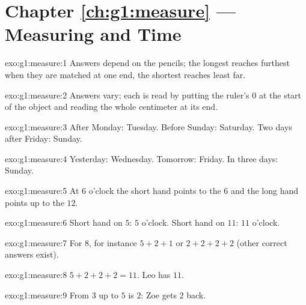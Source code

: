 \section*{Chapter \ref{ch:g1:measure} --- Measuring and Time}

\begin{solution}{exo:g1:measure:1}
Answers depend on the pencils; the longest reaches furthest when
they are matched at one end, the shortest reaches least far.
\end{solution}

\begin{solution}{exo:g1:measure:2}
Answers vary; each is read by putting the ruler's $0$ at the start
of the object and reading the whole centimeter at its end.
\end{solution}

\begin{solution}{exo:g1:measure:3}
After Monday: Tuesday. Before Sunday: Saturday. Two days after
Friday: Sunday.
\end{solution}

\begin{solution}{exo:g1:measure:4}
Yesterday: Wednesday. Tomorrow: Friday. In three days: Sunday.
\end{solution}

\begin{solution}{exo:g1:measure:5}
At $6$ o'clock the short hand points to the $6$ and the long hand
points up to the $12$.
\end{solution}

\begin{solution}{exo:g1:measure:6}
Short hand on $5$: $5$ o'clock. Short hand on $11$: $11$ o'clock.
\end{solution}

\begin{solution}{exo:g1:measure:7}
For $8$, for instance $5 + 2 + 1$ or $2 + 2 + 2 + 2$ (other correct
answers exist).
\end{solution}

\begin{solution}{exo:g1:measure:8}
$5 + 2 + 2 + 2 = 11$. Leo has $11$.
\end{solution}

\begin{solution}{exo:g1:measure:9}
From $3$ up to $5$ is $2$: Zoe gets $2$ back.
\end{solution}
